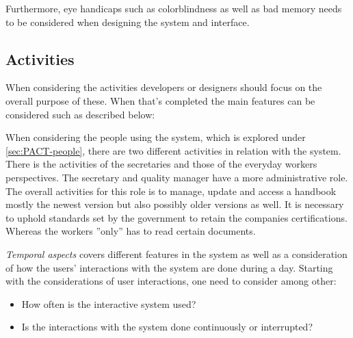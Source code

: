 Furthermore, eye handicaps such as colorblindness as well as bad memory needs to be considered when designing the system and interface.

\subsection{Activities}\label{PACT-actvities}
When considering the activities developers or designers should focus on the overall purpose of these.
When that's completed the main features can be considered such as described below:

When considering the people using the system, which is explored under \cref{sec:PACT-people}, there are two different activities in relation with the system.
There is the activities of the secretaries and those of the everyday workers perspectives.
The secretary and quality manager have a more administrative role.
The overall activities for this role is to manage, update and access a handbook mostly the newest version but also possibly older versions as well.
It is necessary to uphold standards set by the government to retain the companies certifications.
Whereas the workers ''only'' has to read certain documents.

\textit{Temporal aspects} covers different features in the system as well as a consideration of how the users' interactions with the system are done during a day.
Starting with the considerations of user interactions, one need to consider among other:

\begin{itemize}
	\item How often is the interactive system used?
	\item Is the interactions with the system done continuously or interrupted?
\end{itemize}

